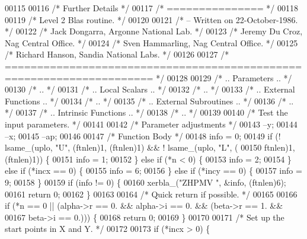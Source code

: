 \begin{DoxyCode}
00115 
00116 \textcolor{comment}{/*  Further Details */}
00117 \textcolor{comment}{/*  =============== */}
00118 
00119 \textcolor{comment}{/*  Level 2 Blas routine. */}
00120 
00121 \textcolor{comment}{/*  -- Written on 22-October-1986. */}
00122 \textcolor{comment}{/*     Jack Dongarra, Argonne National Lab. */}
00123 \textcolor{comment}{/*     Jeremy Du Croz, Nag Central Office. */}
00124 \textcolor{comment}{/*     Sven Hammarling, Nag Central Office. */}
00125 \textcolor{comment}{/*     Richard Hanson, Sandia National Labs. */}
00126 
00127 \textcolor{comment}{/*  ===================================================================== */}
00128 
00129 \textcolor{comment}{/*     .. Parameters .. */}
00130 \textcolor{comment}{/*     .. */}
00131 \textcolor{comment}{/*     .. Local Scalars .. */}
00132 \textcolor{comment}{/*     .. */}
00133 \textcolor{comment}{/*     .. External Functions .. */}
00134 \textcolor{comment}{/*     .. */}
00135 \textcolor{comment}{/*     .. External Subroutines .. */}
00136 \textcolor{comment}{/*     .. */}
00137 \textcolor{comment}{/*     .. Intrinsic Functions .. */}
00138 \textcolor{comment}{/*     .. */}
00139 
00140 \textcolor{comment}{/*     Test the input parameters. */}
00141 
00142     \textcolor{comment}{/* Parameter adjustments */}
00143     --y;
00144     --x;
00145     --ap;
00146 
00147     \textcolor{comment}{/* Function Body */}
00148     info = 0;
00149     \textcolor{keywordflow}{if} (! lsame\_(uplo, \textcolor{stringliteral}{"U"}, (ftnlen)1, (ftnlen)1) && ! lsame\_(uplo, \textcolor{stringliteral}{"L"}, (
00150         ftnlen)1, (ftnlen)1)) \{
00151     info = 1;
00152     \} \textcolor{keywordflow}{else} \textcolor{keywordflow}{if} (*n < 0) \{
00153     info = 2;
00154     \} \textcolor{keywordflow}{else} \textcolor{keywordflow}{if} (*incx == 0) \{
00155     info = 6;
00156     \} \textcolor{keywordflow}{else} \textcolor{keywordflow}{if} (*incy == 0) \{
00157     info = 9;
00158     \}
00159     \textcolor{keywordflow}{if} (info != 0) \{
00160     xerbla\_(\textcolor{stringliteral}{"ZHPMV "}, &info, (ftnlen)6);
00161     \textcolor{keywordflow}{return} 0;
00162     \}
00163 
00164 \textcolor{comment}{/*     Quick return if possible. */}
00165 
00166     \textcolor{keywordflow}{if} (*n == 0 || (alpha->r == 0. && alpha->i == 0. && (beta->r == 1. && 
00167                                                          beta->i == 0.))) \{
00168     \textcolor{keywordflow}{return} 0;
00169     \}
00170 
00171 \textcolor{comment}{/*     Set up the start points in  X  and  Y. */}
00172 
00173     \textcolor{keywordflow}{if} (*incx > 0) \{

\end{DoxyCode}
